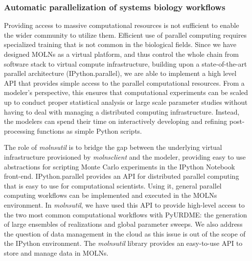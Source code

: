 \documentclass[final,leqno,onefignum,onetabnum]{siamltex1213}
\begin{document}
\subsubsection{Automatic parallelization of systems biology workflows}
Providing access to massive computational resources is not sufficient to enable the wider community to utilize them.  Efficient use of parallel computing requires specialized training that is not common in the biological fields. Since we have designed MOLNs as a virtual platform, and thus control the whole chain from software stack to virtual compute infrastructure, building upon a state-of-the-art parallel architecture (IPython.parallel), we are able to implement a high level API that provides simple access to the parallel computational resources. From a modeler's perspective, this ensures that computational experiments can be scaled up to conduct proper statistical analysis or large scale parameter studies without having to deal with managing a distributed computing infrastructure. Instead, the modelers can spend their time on interactively developing and refining post-processing functions as simple Python scripts.

The role of \emph{molnsutil} is to bridge the gap between the underlying virtual infrastructure provisioned by \emph{molnsclient} and the modeler, providing easy to use abstractions for scripting Monte Carlo experiments in the IPython Notebook front-end.  IPython.parallel provides an API for distributed parallel computing that is easy to use for computational scientists. Using it, general parallel computing workflows can be implemented and executed in the MOLNs environment. In \emph{molnsutil}, we have used this API to provide high-level access to the two most common computational workflows with PyURDME: the generation of large ensembles of realizations and global parameter sweeps. We also address the question of data management in the cloud as this issue is out of the scope of the IPython environment. The \emph{molnsutil} library provides an easy-to-use API to store and manage data in MOLNs. 
\end{document}
